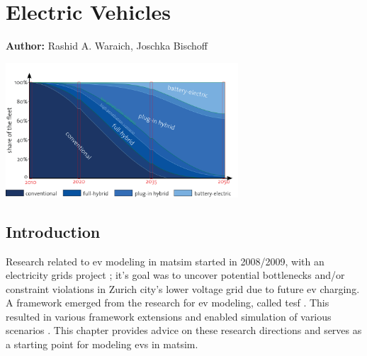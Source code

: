 \chapter{Electric Vehicles}
\label{ch:elvehicles}

\hfill \textbf{Author:} Rashid A. Waraich, Joschka Bischoff

\begin{center} \includegraphics[width=0.65\textwidth, angle=0]{extending/figures/Elvehicles/main.png} \end{center}



\section{Introduction}
Research related to \gls{ev} modeling in \gls{matsim} started in 2008/2009, with an electricity grids project \citep[][]{WaraichEtAl_IATBR_2009, WaraichEtAl_TRR_2013}; it's goal was to uncover potential bottlenecks and/or constraint violations in Zurich city's lower voltage grid due to future \gls{ev} charging. A framework emerged from the research for \gls{ev} modeling, called \gls{tesf} \citep[][]{WaraichEtAl_JanssensEtAl_2014}. This resulted in various framework extensions and enabled simulation of various scenarios \citep[][]{WaraichEtAl_JanssensEtAl_2014, Waraich_PhDThesis_2014, AbedinWaraich_JSDEWES_2014, Schieffer_MastersThesis_2011, GalusAndersson_CIGRE_2011, GalusEtAl_ResRep_EWZ_2012, Bischoff2013MaTaxis and BischoffMaciejewskiEcabMielecMobilTUM}. This chapter provides advice on these research directions and serves as a starting point for modeling \glspl{ev} in \gls{matsim}.

